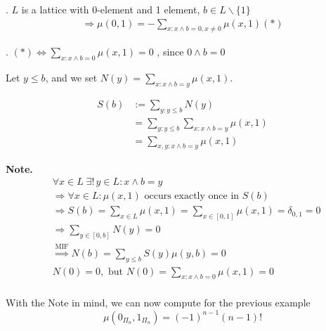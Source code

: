 \Theorem.
$L$ is a lattice with 0-element and 1 element, $b \in L\backslash \{1\}$
\begin{align*}
    \Rightarrow \mu(0,1) = -\sum_{x: x\wedge b = 0, x \neq 0} \mu(x,1) (*)
\end{align*}

\Proof.
$(*) \Leftrightarrow \sum_{x: x\wedge b = 0} \mu(x,1) = 0$
, since $0 \wedge b = 0$

Let $y \leq b$, and we set $N(y) = \sum_{x: x\wedge b=y} \mu(x,1)$.

\begin{align*}
  S(b) &:= \sum_{y: y \leq b} N(y) \\
    & = \sum_{y: y \leq b} \sum_{x: x\wedge b=y} \mu(x,1) \\
    & = \sum_{x,y: x \wedge b = y} \mu(x,1)
\end{align*}

\textbf{Note.}
\begin{align*}
  &\forall x \in L \; \exists!\, y \in L : x \wedge b = y \\
  &\Rightarrow \forall x \in L: \mu(x,1) \text{ occurs exactly once in $S(b)$} \\
  &\Rightarrow S(b) = \sum_{x \in L} \mu(x,1) = \sum_{x \in [0,1]} \mu(x,1) = \delta_{0,1} = 0 \\
  &\Rightarrow \sum_{y \in [0,b]} N(y) = 0 \\
  &\stackrel{\text{MIF}}{\Rightarrow} N(b) = \sum_{y \leq b} S(y) \mu(y,b) = 0\\
  &N(0) = 0, \text{ but } N(0) = \sum_{x:x \wedge b = 0} \mu(x,1) = 0 \\
\end{align*}

With the Note in mind, we can now compute for the previous example
\[
    \mu( 0_{\Pi_n}, 1_{\Pi_n}) = (-1)^{n-1} (n-1)!
\]






